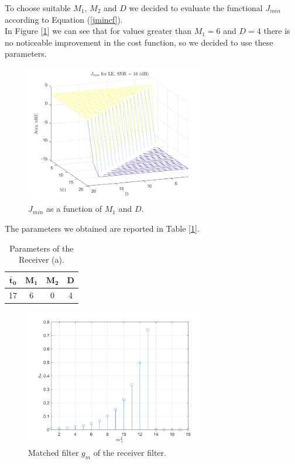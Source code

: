 \documentclass[a4paper, 12pt]{report}
\begin{document}
To choose suitable $M_1$, $M_2$ and $D$ we decided to evaluate the functional $J_{min}$ according to Equation (\ref{jmincf}).\\
In Figure [\ref{j_min_le}] we can see that for values greater than $M_1=6$ and $D=4$ there is no noticeable improvement in the cost function, so we decided to use these parameters.

\begin{figure}[H]
	\centering
	\includegraphics[width=8cm]{images/optimal_params_LE}
	\caption{$J_{min}$ as a function of $M_1$ and $D$.}\label{j_min_le}
\end{figure}

The parameters we obtained are reported in Table [\ref{Tab_a}].

\begin{table}[H]
	\centering
	\begin{tabular}{c c c c}
		\toprule
		$\mathbf{\bar{t}_0}$ & $\mathbf{M_1}$ & $\mathbf{M_2}$ & \textbf{D}     \\
		\midrule
		17 & 6 & 0 & 4 \\
		\bottomrule			
	\end{tabular}
	\caption{Parameters of the Receiver (a).}
	\label{Tab_a}
\end{table}

\begin{figure}[H]
	\centering
	\includegraphics[width=8cm]{images/RecA_gm}
	\caption{Matched filter $g_m$ of the receiver filter.}\label{gm_a}
\end{figure}
\end{document}
